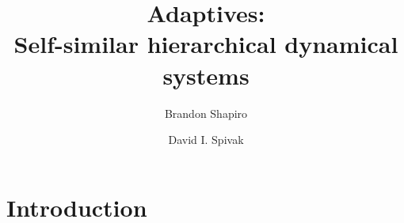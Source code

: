 \documentclass[11pt, one side, article]{memoir}
\theoremstyle{definition}
\theoremstyle{plain}
\newcommand{\0}{\textsf{0}}
\newcommand{\1}{\tn{\textsf{1}}}
\begin{document}
\title{Adaptives:\\Self-similar hierarchical dynamical systems}

\author{Brandon Shapiro \and David I. Spivak}

\date{\vspace{-.2in}}

\maketitle

\begin{abstract}

\end{abstract}

\chapter{Introduction}

%
%
%
%
\end{document}
